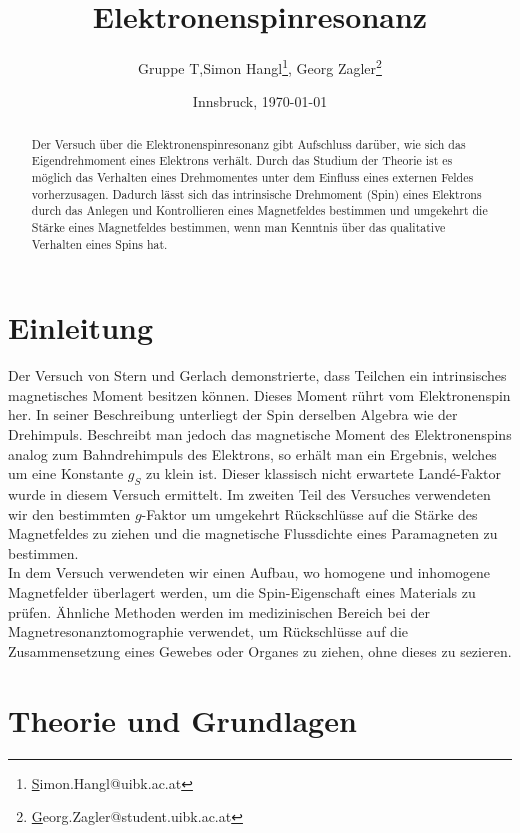 \documentclass[a4paper,10pt]{scrartcl} %
\title{Elektronenspinresonanz}
\author{Gruppe T,Simon Hangl\footnote{\href{mailto:simon.hangl@uibk.ac.at}Simon.Hangl@uibk.ac.at}, Georg Zagler\footnote{\href{mailto:georg.zagler@student.uibk.ac.at}Georg.Zagler@student.uibk.ac.at}}
\date{Innsbruck, \today}
\begin{document}
\maketitle
\newpage{}
\tableofcontents{}
\newpage{}

\begin{abstract}
Der Versuch über die Elektronenspinresonanz gibt Aufschluss darüber, wie sich das Eigendrehmoment eines Elektrons verhält. Durch das Studium der Theorie ist es möglich das Verhalten eines Drehmomentes unter dem Einfluss eines externen Feldes vorherzusagen. Dadurch lässt sich das intrinsische Drehmoment (Spin) eines Elektrons durch das Anlegen und Kontrollieren eines Magnetfeldes bestimmen und umgekehrt die Stärke eines Magnetfeldes bestimmen, wenn man Kenntnis über das qualitative Verhalten eines Spins hat.
\end{abstract}
\section{Einleitung}
\label{sec:einleitung}
Der Versuch von Stern und Gerlach demonstrierte, dass Teilchen ein intrinsisches magnetisches Moment besitzen können\cite{Schwabl}. Dieses Moment rührt vom Elektronenspin her. In seiner Beschreibung unterliegt der Spin derselben Algebra wie der Drehimpuls. Beschreibt man jedoch das magnetische Moment des Elektronenspins analog zum Bahndrehimpuls des Elektrons, so erhält man ein Ergebnis, welches um eine Konstante $g_S$ zu klein ist. Dieser klassisch nicht erwartete Landé-Faktor wurde in diesem Versuch ermittelt. Im zweiten Teil des Versuches verwendeten wir den bestimmten $g$-Faktor um umgekehrt Rückschlüsse auf die Stärke des Magnetfeldes zu ziehen und die magnetische Flussdichte eines Paramagneten zu bestimmen.\\
In dem Versuch verwendeten wir einen Aufbau, wo homogene und inhomogene Magnetfelder überlagert werden, um die Spin-Eigenschaft eines Materials zu prüfen. Ähnliche Methoden werden im medizinischen Bereich bei der Magnetresonanztomographie verwendet, um Rückschlüsse auf die Zusammensetzung eines Gewebes oder Organes zu ziehen, ohne dieses zu sezieren.

\section{Theorie und Grundlagen}
\label{sec:theorie}
\end{document}
